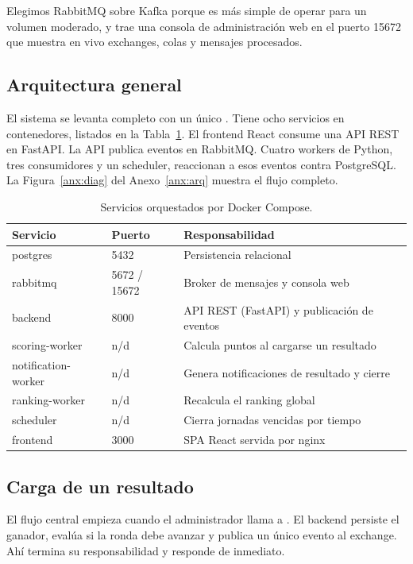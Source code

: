 Elegimos RabbitMQ sobre Kafka porque es más simple de operar para un volumen moderado, y trae una consola de administración web en el puerto 15672 que muestra en vivo exchanges, colas y mensajes procesados.

\subsection{Arquitectura general}

El sistema se levanta completo con un único . Tiene ocho servicios en contenedores, listados en la Tabla~\ref{tab:services}. El frontend React consume una API REST en FastAPI. La API publica eventos en RabbitMQ. Cuatro workers de Python, tres consumidores y un scheduler, reaccionan a esos eventos contra PostgreSQL. La Figura~\ref{anx:diag} del Anexo~\ref{anx:arq} muestra el flujo completo.

\begin{table}[h]
\centering
\small
\renewcommand{\arraystretch}{1.22}
\begin{tabularx}{\linewidth}{@{}>{\ttfamily}l l X@{}}
\toprule
\textbf{Servicio} & \textbf{Puerto} & \textbf{Responsabilidad} \\
\midrule
postgres & 5432 & Persistencia relacional \\
rabbitmq & 5672 / 15672 & Broker de mensajes y consola web \\
backend & 8000 & API REST (FastAPI) y publicación de eventos \\
scoring-worker & n/d & Calcula puntos al cargarse un resultado \\
notification-worker & n/d & Genera notificaciones de resultado y cierre \\
ranking-worker & n/d & Recalcula el ranking global \\
scheduler & n/d & Cierra jornadas vencidas por tiempo \\
frontend & 3000 & SPA React servida por nginx \\
\bottomrule
\end{tabularx}
\caption{Servicios orquestados por Docker Compose.}
\label{tab:services}
\end{table}

\subsection{Carga de un resultado}

El flujo central empieza cuando el administrador llama a . El backend persiste el ganador, evalúa si la ronda debe avanzar y publica un único evento al exchange. Ahí termina su responsabilidad y responde de inmediato.

